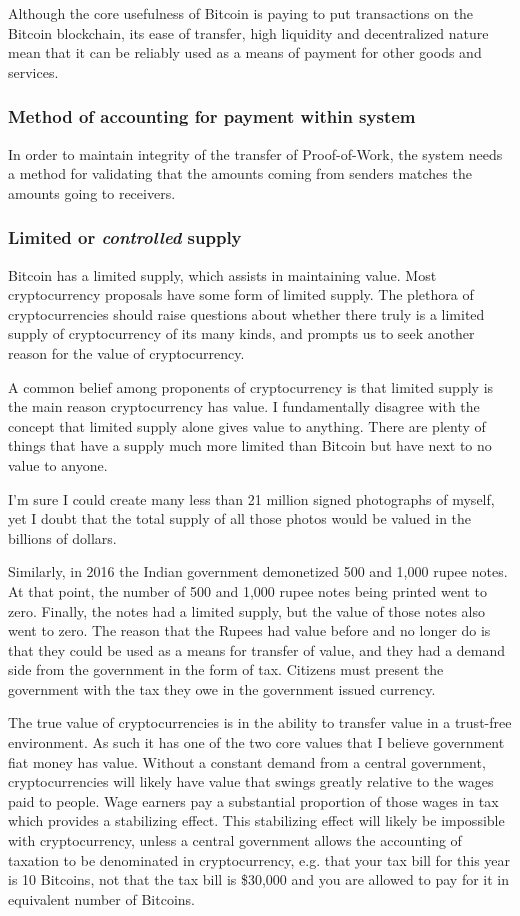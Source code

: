 \documentclass[a4paper,12pt]{article}
\begin{document}
Although the core usefulness of Bitcoin is paying to put transactions on the Bitcoin blockchain, its ease of transfer, high liquidity and decentralized nature mean that it can be reliably used as a means of payment for other goods and services.

\subsubsection{Method of accounting for payment within system}
In order to maintain integrity of the transfer of Proof-of-Work, the system needs a method for validating that the amounts coming from senders matches the amounts going to receivers. 

\subsubsection{Limited or \textit{controlled} supply}
Bitcoin has a limited supply, which assists in maintaining value. Most cryptocurrency proposals have some form of limited supply. The plethora of cryptocurrencies should raise questions about whether there truly is a limited supply of cryptocurrency of its many kinds, and prompts us to seek another reason for the value of cryptocurrency.

A common belief among proponents of cryptocurrency is that limited supply is the main reason cryptocurrency has value. I fundamentally disagree with the concept that limited supply alone gives value to anything. There are plenty of things that have a supply much more limited than Bitcoin but have next to no value to anyone. 

I'm sure I could create many less than 21 million signed photographs of myself, yet I doubt that the total supply of all those photos would be valued in the billions of dollars.

Similarly, in 2016 the Indian government demonetized 500 and 1,000 rupee notes. At that point, the number of 500 and 1,000 rupee notes being printed went to zero. Finally, the notes had a limited supply, but the value of those notes also went to zero. The reason that the Rupees had value before and no longer do is that they could be used as a means for transfer of value, and they had a demand side from the government in the form of tax. Citizens must present the government with the tax they owe in the government issued currency.

The true value of cryptocurrencies is in the ability to transfer value in a trust-free environment. As such it has one of the two core values that I believe government fiat money has value. Without a constant demand from a central government, cryptocurrencies will likely have value that swings greatly relative to the wages paid to people. Wage earners pay a substantial proportion of those wages in tax which provides a stabilizing effect. This stabilizing effect will likely be impossible with cryptocurrency, unless a central government allows the accounting of taxation to be denominated in cryptocurrency, e.g. that your tax bill for this year is 10 Bitcoins, not that the tax bill is \$30,000 and you are allowed to pay for it in equivalent number of Bitcoins.
\end{document}

